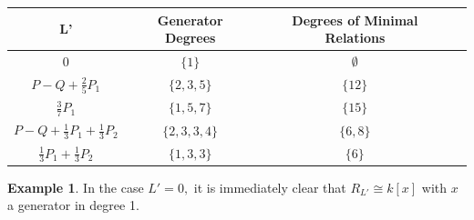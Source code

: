 \documentclass{amsart}
\theoremstyle{plain}
\theoremstyle{definition}
\newtheorem{example}[thm]{Example}
\theoremstyle{remark}
\numberwithin{equation}{section}
\newcommand \halfcan{L}
\begin{document}
\begin{longtable}	{| c || c | c | c |}
	\hline
	L' & Generator Degrees & Degrees of Minimal Relations \\
	\hline
	\hline
	$0$ & $\{1\}$ & $\emptyset$ \\	\hline

	$P - Q + \frac{2}{5}P_1$ & $\{2,3,5\}$ & $\{12\}$ \\	\hline
	
	$\frac{3}{7}P_1$ & $\{1,5,7\}$ & $\{15\}$ \\	\hline

	$P - Q + \frac{1}{3}P_1 + \frac{1}{3}P_2$ & $\{2, 3, 3, 4\}$ & $\{6,8\}$ \\	\hline
	$\frac{1}{3}P_1 + \frac{1}{3}P_2$ & $\{1, 3, 3\}$ & $\{6\}$ \\	\hline
	
\end{longtable}

\begin{example}
\label{eg:base- 1-0}
In the case $\halfcan' = 0,$ it is immediately clear that $R_{\halfcan'} \cong k[x]$ with $x$ a generator in degree 1.
\end{example}
\end{document}
